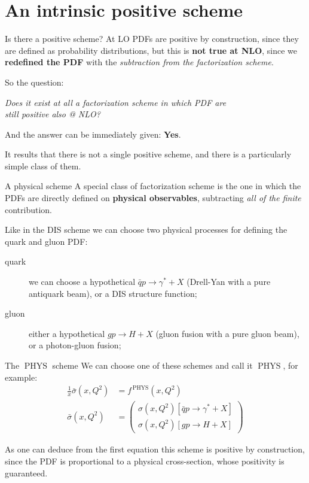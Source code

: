 \documentclass[9pt]{beamer}
\DeclareMathOperator{\phys}{PHYS}
\begin{document}
\section{An intrinsic positive scheme}
\begin{frame}{Is there a positive scheme?}
    At LO PDFs are positive by construction, since they are defined as
    probability distributions, but this is \textbf{not true at NLO}, since we
    \textbf{redefined the PDF} with the \textit{subtraction from the
    factorization scheme}.\newline

    So the question:

    \begin{center}
        \textit{Does it exist at all a factorization scheme in which PDF are\\ still positive also @ NLO?}
    \end{center}

    And the answer can be immediately given: \textbf{Yes}.\newline

    It results that there is not a single positive scheme, and there is a
    particularly simple class of them.
\end{frame}

\begin{frame}{A physical scheme}
    A special class of factorization scheme is the one in which the PDFs are
    directly defined on \textbf{physical observables}, subtracting \textit{all
    of the finite} contribution.

    Like in the DIS scheme we can choose two physical processes for defining the quark and gluon PDF:
    \begin{description}
        \item[quark] we can choose a hypothetical $\bar{q} p \to \gamma^* + X$
        (Drell-Yan with a pure antiquark beam), or a DIS structure function;
        \item[gluon] either a hypothetical $g p \to H + X$ (gluon fusion with a
        pure gluon beam), or a photon-gluon fusion;
    \end{description}
\end{frame}

\begin{frame}{The $\phys$ scheme}
    We can choose one of these schemes and call it $\phys$, for example:
    \begin{align*}
        \frac{1}{x}\bar{\sigma}(x,Q^2) &= f^{\,\phys}(x,Q^2)\\
        \bar{\sigma}(x,Q^2) &= \begin{pmatrix}
        \sigma(x,Q^2)[\bar{q} p \to \gamma^* + X]\\
        \sigma(x,Q^2)[g p \to H + X]
        \end{pmatrix}
    \end{align*}

    As one can deduce from the first equation this scheme is positive by
    construction, since the PDF is proportional to a physical cross-section,
    whose positivity is guaranteed.
\end{frame}
\end{document}
